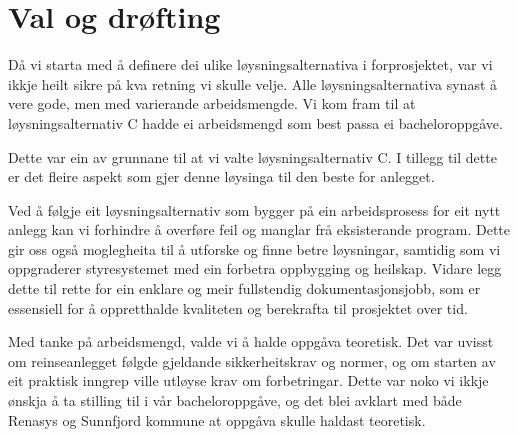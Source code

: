 \section{Val og drøfting}

Då vi starta med å definere dei ulike løysningsalternativa i forprosjektet, var vi
ikkje heilt sikre på kva retning vi skulle velje. Alle løysningsalternativa synast å vere gode,
men med varierande arbeidsmengde. Vi kom fram til at løysningsalternativ C hadde ei arbeidsmengd
som best passa ei bacheloroppgåve.

Dette var ein av grunnane til at vi valte løysningsalternativ C.
I tillegg til dette er det fleire aspekt som gjer denne løysinga til den beste for anlegget.

Ved å følgje eit løysningsalternativ som bygger på ein arbeidsprosess for eit nytt anlegg 
kan vi forhindre å overføre feil og manglar frå eksisterande program. 
Dette gir oss også moglegheita til å utforske og finne betre løysningar, 
samtidig som vi oppgraderer styresystemet med ein forbetra oppbygging og heilskap.
Vidare legg dette til rette for ein enklare og meir fullstendig dokumentasjonsjobb, 
som er essensiell for å oppretthalde kvaliteten og berekrafta til prosjektet over tid.

Med tanke på arbeidsmengd, valde vi å halde oppgåva teoretisk.
Det var uvisst om reinseanlegget følgde gjeldande sikkerheitskrav og normer,
og om starten av eit praktisk inngrep ville utløyse krav om forbetringar.
Dette var noko vi ikkje ønskja å ta stilling til i vår bacheloroppgåve, og det blei avklart
med både Renasys og Sunnfjord kommune at oppgåva skulle haldast teoretisk.

